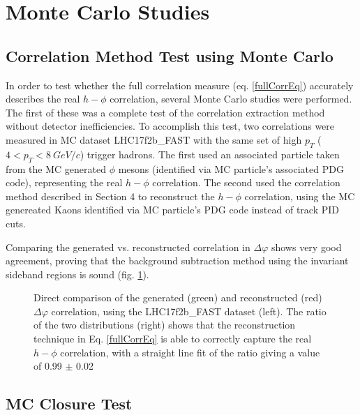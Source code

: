 \documentclass[ALICE,manyauthors]{ALICE_analysis_notes}
\begin{document}
\section{Monte Carlo Studies}

\subsection{Correlation Method Test using Monte Carlo}

In order to test whether the full correlation measure (eq. \ref{fullCorrEq}) accurately describes the real $h-\phi$ correlation, several Monte Carlo studies were performed.  The first of these was a complete test of the correlation extraction method without detector inefficiencies.  To accomplish this test, two correlations were measured in MC dataset LHC17f2b\_FAST with the same set of high $p_T$ ($4 < p_T < \SI{8}{GeV/c}$) trigger hadrons.  The first used an associated particle taken from the MC generated $\phi$ mesons (identified via MC particle's associated PDG code), representing the real $h-\phi$ correlation. The second used the correlation method described in Section 4 to reconstruct the $h-\phi$ correlation, using the MC genereated Kaons identified via MC particle's PDG code instead of track PID cuts.

Comparing the generated vs. reconstructed correlation in $\Delta\varphi$ shows very good agreement, proving that the background subtraction method using the invariant sideband regions is sound (fig. \ref{methodtestFAST}).

\begin{figure}[ht]
\centering
\begin{subfigure}{
\texttt{[image: images/truevsmethod.pdf]}}
\end{subfigure}
\begin{subfigure}{
\texttt{[image: images/ratio\_method-true\_fit.pdf]}}
\end{subfigure}
\caption{Direct comparison of the generated (green) and reconstructed (red) $\Delta\varphi$ correlation, using the LHC17f2b\_FAST dataset (left). The ratio of the two distributions (right) shows that the reconstruction technique in Eq. \ref{fullCorrEq} is able to correctly capture the real $h-\phi$ correlation, with a straight line fit of the ratio giving a value of 0.99 $\pm$ 0.02}
\label{methodtestFAST}
\end{figure}

\subsection{MC Closure Test}
\end{document}
